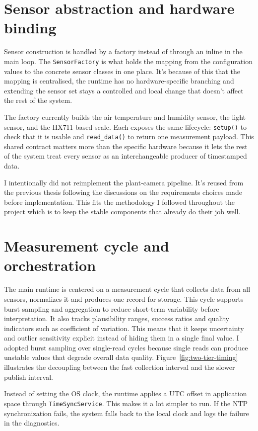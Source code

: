 \section{Sensor abstraction and hardware binding}

Sensor construction is handled by a factory instead of through an inline in the main loop. The \texttt{SensorFactory} is what holds the mapping from the configuration values to the concrete sensor classes in one place. It's because of this that the  mapping is centralised, the runtime has no hardware-specific branching and extending the sensor set stays a controlled and local change that doesn't affect the rest of the system.

The factory currently builds the air temperature and humidity sensor, the light sensor, and the HX711-based scale. Each exposes the same lifecycle: \texttt{setup()} to check that it is usable and \texttt{read\_data()} to return one measurement payload. This shared contract matters more than the specific hardware because it lets the rest of the system treat every sensor as an interchangeable producer of timestamped data.

I intentionally did not reimplement the plant-camera pipeline. It's reused from the previous thesis following the discussions on the requirements choices made before implementation. This fits the methodology I followed throughout the project which is to keep the stable components that already do their job well.

\section{Measurement cycle and orchestration}

The main runtime is centered on a measurement cycle that collects data from all sensors, normalizes it and produces one record for storage. This cycle supports burst sampling and aggregation to reduce short-term variability before interpretation. It also tracks plausibility ranges, success ratios and quality indicators such as coefficient of variation. This means that it keeps uncertainty and outlier sensitivity explicit instead of hiding them in a single final value. I adopted burst sampling over single-read cycles because single reads can produce unstable values that degrade overall data quality. Figure~\ref{fig:two-tier-timing} illustrates the decoupling between the fast collection interval and the slower publish interval.

Instead of setting the OS clock, the runtime applies a UTC offset in application space through \texttt{TimeSyncService}. This makes it a lot simpler to run. If the NTP synchronization fails, the system falls back to the local clock and logs the failure in the diagnostics.

